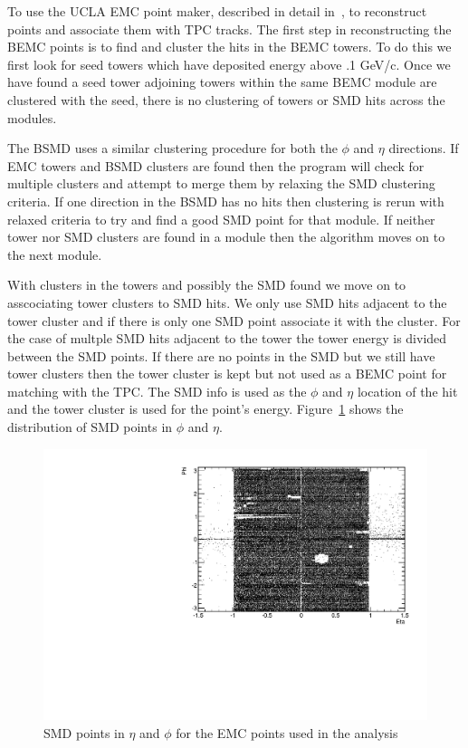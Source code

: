 To use the UCLA EMC point maker, described in detail in~\cite{dongthesis}, to reconstruct points and associate them with TPC tracks. The first step in reconstructing the BEMC points is to find and cluster the hits in the BEMC towers. To do this we first look for seed towers which have deposited energy above .1 GeV/c. Once we have found a seed tower adjoining towers within the same BEMC module are clustered with the seed, there is no clustering of towers or SMD hits across the modules. 

The BSMD uses a similar clustering procedure for both the $\phi$ and $\eta$ directions. If EMC towers and BSMD clusters are found then the program will check for multiple clusters and attempt to merge them by relaxing the SMD clustering criteria. If one direction in the BSMD has no hits then clustering is rerun with relaxed criteria to try and find a good SMD point for that module. If neither tower nor SMD clusters are found in a module then the algorithm moves on to the next module. 

With clusters in the towers and possibly the SMD found we move on to asscociating tower clusters to SMD hits. We only use SMD hits adjacent to the tower cluster and if there is only one SMD point associate it with the cluster. For the case of multple SMD hits adjacent to the tower the tower energy is divided between the SMD points. If there are no points in the SMD but we still have tower clusters then the tower cluster is kept but not used as a BEMC point for matching with the TPC. The SMD info is used as the $\phi$ and $\eta$ location of the hit and the tower cluster is used for the point's energy. Figure~\ref{fig:SMDetaphi} shows the distribution of SMD points in $\phi$ and $\eta$.

\begin{figure}[htbp]
\begin{center}
\includegraphics[scale=.75]{Plots/NPE/SMD_phi_eta.pdf}
\end{center}
\caption[SMD Point $\eta$ and $\phi$]{SMD points in $\eta$ and $\phi$ for the EMC points used in the analysis}
\label{fig:SMDetaphi}
\end{figure}

